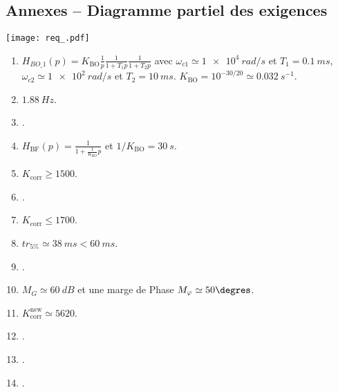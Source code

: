 \begin{multicols}{2}
\subsection*{Annexes -- Diagramme partiel des exigences\label{Annexe_diag_exigences}}
\begin{center}
\texttt{[image: req\_.pdf]}

\end{center}
\fi






\ifprof
\else
\footnotesize
\begin{enumerate}
\item $H_{BO\_1}(p) = K_{\text{BO}}  \frac{1}{p} \frac{1}{1+T_1p}  \frac{1}{1+T_2p} $ avec 
$\omega_{c1} \simeq \SI{1e4}{rad/s}$ et $T_1 = \SI{0,1}{ms}$, 
$\omega_{c2} \simeq \SI{1e2}{rad/s}$ et $T_2 = \SI{10}{ms}$. $K_{\text{BO}} = 10^{-30/20} \simeq  \SI{0,032}{s^{-1}}$.
\item $\SI{1,88}{Hz}$.
\item .
\item $H_{\text{BF}}(p)= \frac{1}{1+\frac{1}{K_{\text{BO}}}p}$ et $1/K_{\text{BO}} =\SI{30}{s}$.\\
\item $K_{\text{corr}} \ge  1500$.
\item .
\item $K_{\text{corr}} \leq  1700$.
\item $tr_{5\%} \simeq  \SI{38}{ms} < \SI{60}{ms}$.
\item .
\item $M_G \simeq \SI{60}{dB}$ et une marge de Phase $M_{\varphi} \simeq 50\degres$.
\item $K_{\text{corr}}^{\text{new}} \simeq 5620$.
\item .
\item .
\item .
\end{enumerate}

\normalsize
\end{multicols}
\fi



